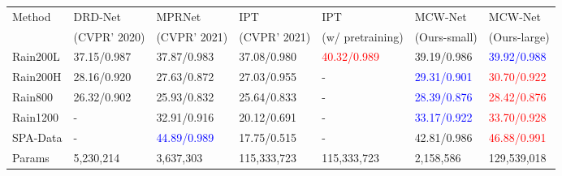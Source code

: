 \documentclass[a4paper,fleqn]{cas-dc}
\begin{document}
\begin{table*}[]
{{\begin{tabular*}{\tblwidth}{@{}LLLLLLL@{}}
	\bottomrule
	
		Method      &  DRD-Net \cite{deng2020detail}  & MPRNet \cite{zamir2021multi} & IPT \cite{chen2021pre} & IPT \cite{chen2021pre}  & MCW-Net  & MCW-Net\\
	      &  (CVPR' 2020) & (CVPR' 2021) & (CVPR' 2021) & (w/ pretraining) & (Ours-small) & (Ours-large)\\ 
		\midrule
		Rain200L  &    37.15/0.987                      &37.87/0.983 & 37.08/0.980 &\textcolor{red}{40.32/0.989}& {39.19/0.986} & \textcolor{blue}{39.92/0.988} \\ 
		Rain200H  &     {28.16/0.920}    &27.63/0.872 &27.03/0.955& - &   \textcolor{blue}{29.31/0.901} & \textcolor{red}{30.70/0.922} \\ 
		Rain800    &   26.32/0.902       &25.93/0.832  &25.64/0.833 & -& \textcolor{blue}{28.39/0.876} & \textcolor{red}{28.42/0.876}\\
		Rain1200  &    -   &{32.91/0.916} &20.12/0.691& - & \textcolor{blue}{33.17/0.922} & \textcolor{red}{33.70/0.928}\\ 
SPA-Data  &   -    &\textcolor{blue}{44.89/0.989}    & 17.75/0.515 &-& {42.81/0.986} & \textcolor{red}{46.88/0.991}\\ 
		Params &     5,230,214    &3,637,303  &115,333,723& 115,333,723  & 2,158,586 & 129,539,018 \\  

	\bottomrule
	
	\end{tabular*} }
	}
	\smallskip
	\label{table:syn}
\end{table*}
\end{document}
